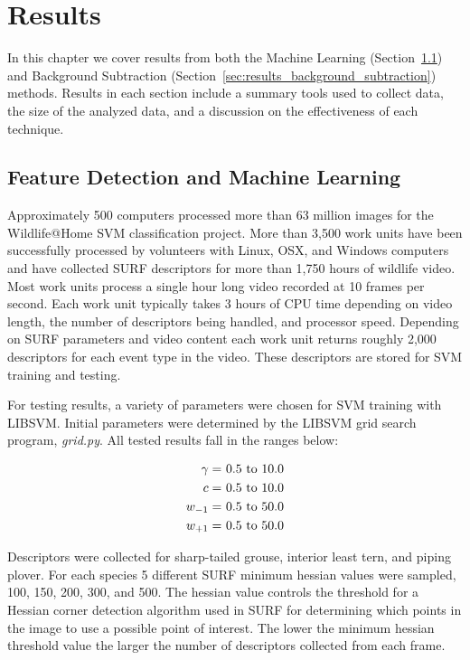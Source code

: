 \chapter{Results}
\label{ch:results}

In this chapter we cover results from both the Machine Learning (Section~\ref{sec:results_machine_learning}) and Background Subtraction (Section~\ref{sec:results_background_subtraction}) methods. Results in each section include a summary tools used to collect data, the size of the analyzed data, and a discussion on the effectiveness of each technique.

\section{Feature Detection and Machine Learning}
\label{sec:results_machine_learning}

Approximately 500 computers processed more than 63 million images for the Wildlife@Home SVM classification project. More than 3,500 work units have been successfully processed by volunteers with Linux, OSX, and Windows computers and have collected SURF descriptors for more than 1,750 hours of wildlife video. Most work units process a single hour long video recorded at 10 frames per second. Each work unit typically takes 3 hours of CPU time depending on video length, the number of descriptors being handled, and processor speed. Depending on SURF parameters and video content each work unit returns roughly 2,000 descriptors for each event type in the video. These descriptors are stored for SVM training and testing.

For testing results, a variety of parameters were chosen for SVM training with LIBSVM\@. Initial parameters were determined by the LIBSVM grid search program, \emph{grid.py}. All tested results fall in the ranges below:

\begin{align}
\gamma =&~\text{\numrange{0.5}{10.0}} \nonumber \\
c =&~\text{\numrange{0.5}{10.0}} \nonumber \\
w_{-1} =&~\text{\numrange{0.5}{50.0}} \nonumber \\
w_{+1} =&~\text{\numrange{0.5}{50.0}} \nonumber
\label{eq:svm_parameters}
\end{align}

Descriptors were collected for sharp-tailed grouse, interior least tern, and piping plover. For each species 5 different SURF minimum hessian values were sampled, 100, 150, 200, 300, and 500. The hessian value controls the threshold for a Hessian corner detection algorithm used in SURF for determining which points in the image to use a possible point of interest. The lower the minimum hessian threshold value the larger the number of descriptors collected from each frame.

